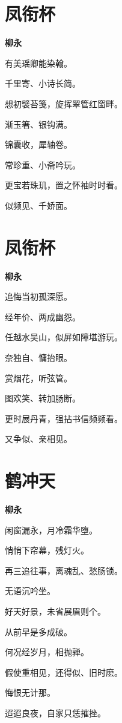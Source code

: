 \documentclass[12pt,a4paper]{ctexbook}
\begin{document}
\section{凤衔杯}
\textbf{柳永}\par\vspace{0.5em}
有美瑶卿能染翰。\par
千里寄、小诗长简。\par
想初襞苔笺，旋挥翠管红窗畔。\par
渐玉箸、银钩满。\par
锦囊收，犀轴卷。\par
常珍重、小斋吟玩。\par
更宝若珠玑，置之怀袖时时看。\par
似频见、千娇面。\par

\section{凤衔杯}
\textbf{柳永}\par\vspace{0.5em}
追悔当初孤深愿。\par
经年价、两成幽怨。\par
任越水吴山，似屏如障堪游玩。\par
奈独自、慵抬眼。\par
赏烟花，听弦管。\par
图欢笑、转加肠断。\par
更时展丹青，强拈书信频频看。\par
又争似、亲相见。\par

\section{鹤冲天}
\textbf{柳永}\par\vspace{0.5em}
闲窗漏永，月冷霜华堕。\par
悄悄下帘幕，残灯火。\par
再三追往事，离魂乱、愁肠锁。\par
无语沉吟坐。\par
好天好景，未省展眉则个。\par
从前早是多成破。\par
何况经岁月，相抛亸。\par
假使重相见，还得似、旧时麽。\par
悔恨无计那。\par
迢迢良夜，自家只恁摧挫。\par
\end{document}
